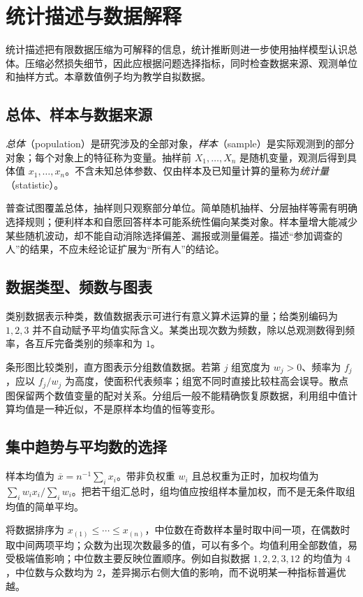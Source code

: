 \setcounter{chapter}{22} %
\chapter{统计描述与数据解释}
\label{chap:em-statistics}
统计描述把有限数据压缩为可解释的信息，统计推断则进一步使用抽样模型认识总体。压缩必然损失细节，因此应根据问题选择指标，同时检查数据来源、观测单位和抽样方式。本章数值例子均为教学自拟数据。

\section{总体、样本与数据来源}
\emph{总体}（population）是研究涉及的全部对象，\emph{样本}（sample）是实际观测到的部分对象；每个对象上的特征称为变量。抽样前 $X_1,\ldots,X_n$ 是随机变量，观测后得到具体值 $x_1,\ldots,x_n$。不含未知总体参数、仅由样本及已知量计算的量称为\emph{统计量}（statistic）。

普查试图覆盖总体，抽样则只观察部分单位。简单随机抽样、分层抽样等需有明确选择规则；便利样本和自愿回答样本可能系统性偏向某类对象。样本量增大能减少某些随机波动，却不能自动消除选择偏差、漏报或测量偏差。描述“参加调查的人”的结果，不应未经论证扩展为“所有人”的结论。

\section{数据类型、频数与图表}
类别数据表示种类，数值数据表示可进行有意义算术运算的量；给类别编码为 $1,2,3$ 并不自动赋予平均值实际含义。某类出现次数为频数，除以总观测数得到频率，各互斥完备类别的频率和为 $1$。

条形图比较类别，直方图表示分组数值数据。若第 $j$ 组宽度为 $w_j>0$、频率为 $f_j$，应以 $f_j/w_j$ 为高度，使面积代表频率；组宽不同时直接比较柱高会误导。散点图保留两个数值变量的配对关系。分组后一般不能精确恢复原数据，利用组中值计算均值是一种近似，不是原样本均值的恒等变形。

\section{集中趋势与平均数的选择}
样本均值为 $\overline x=n^{-1}\sum_i x_i$。带非负权重 $w_i$ 且总权重为正时，加权均值为 $\sum_iw_ix_i/\sum_iw_i$。把若干组汇总时，组均值应按组样本量加权，而不是无条件取组均值的简单平均。

将数据排序为 $x_{(1)}\le\cdots\le x_{(n)}$，中位数在奇数样本量时取中间一项，在偶数时取中间两项平均；众数为出现次数最多的值，可以有多个。均值利用全部数值，易受极端值影响；中位数主要反映位置顺序。例如自拟数据 $1,2,2,3,12$ 的均值为 $4$，中位数与众数均为 $2$，差异揭示右侧大值的影响，而不说明某一种指标普遍优越。

